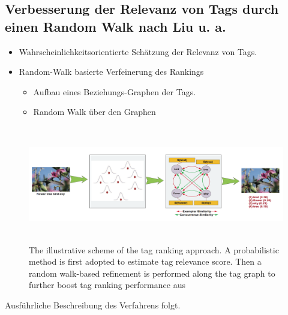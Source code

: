 
\subsection{Verbesserung der Relevanz von Tags durch einen Random Walk nach Liu u. a.} %
\label{sub:verbesserung_der_relevanz_durch_einen_random_walk}

\begin{itemize}
  \item Wahrscheinlichkeitsorientierte Schätzung der Relevanz von Tags.
  \item Random-Walk basierte Verfeinerung des Rankings
    
    \begin{itemize}
      \item Aufbau eines Beziehungs-Graphen der Tags.
      \item Random Walk über den Graphen
    \end{itemize}
\end{itemize}

\begin{figure}[htbp]
  \centering
    \includegraphics[height=2in]{images/tag_ranking_verfahren.png}
  \caption{The illustrative scheme of the tag ranking approach. A probabilistic method is first adopted to estimate tag relevance score. Then a random walk-based refinement is performed along the tag graph to further boost tag ranking performance aus \cite{ranking}}
  \label{fig:images_tag_ranking_verfahren}
\end{figure}


Ausführliche Beschreibung des Verfahrens folgt.

